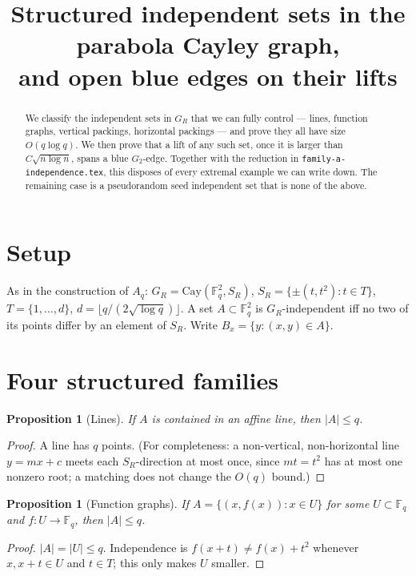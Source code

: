 \documentclass[11pt]{article}
\title{Structured independent sets in the parabola Cayley graph,\\
and open blue edges on their lifts}
\date{}
\newtheorem{proposition}[theorem]{Proposition}
\theoremstyle{definition}
\newcommand{\F}{\mathbb{F}}
\begin{document}
\maketitle

\begin{abstract}
We classify the independent sets in $G_R$ that we can fully control --- lines, function graphs, vertical packings, horizontal packings --- and prove they all have size $O(q\log q)$.
We then prove that a lift of any such set, once it is larger than $C\sqrt{n\log n}$, spans a blue $G_2$-edge.
Together with the reduction in \texttt{family-a-independence.tex}, this disposes of every extremal example we can write down.
The remaining case is a pseudorandom seed independent set that is none of the above.
\end{abstract}

\section{Setup}

As in the construction of $A_q$: $G_R=\mathrm{Cay}(\F_q^{2},S_R)$, $S_R=\{\pm(t,t^{2}):t\in T\}$, $T=\{1,\dots,d\}$, $d=\lfloor q/(2\sqrt{\log q})\rfloor$.
A set $A\subset\F_q^{2}$ is $G_R$-independent iff no two of its points differ by an element of $S_R$.
Write $B_x=\{y:(x,y)\in A\}$.

\section{Four structured families}

\begin{proposition}[Lines]\label{prop:line}
If $A$ is contained in an affine line, then $|A|\le q$.
\end{proposition}

\begin{proof}
A line has $q$ points.
(For completeness: a non-vertical, non-horizontal line $y=mx+c$ meets each $S_R$-direction at most once, since $mt=t^{2}$ has at most one nonzero root; a matching does not change the $O(q)$ bound.)
\end{proof}

\begin{proposition}[Function graphs]\label{prop:fn}
If $A=\{(x,f(x)):x\in U\}$ for some $U\subset\F_q$ and $f\colon U\to\F_q$, then $|A|\le q$.
\end{proposition}

\begin{proof}
$|A|=|U|\le q$.
Independence is $f(x+t)\ne f(x)+t^{2}$ whenever $x,x+t\in U$ and $t\in T$; this only makes $U$ smaller.
\end{proof}
\end{document}
